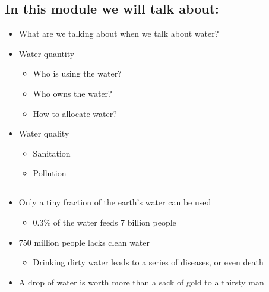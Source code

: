 \documentclass[]{article}
\providecommand{\tightlist}{%
  \setlength{\itemsep}{0pt}\setlength{\parskip}{0pt}}
\begin{document}
\hypertarget{in-this-module-we-will-talk-about}{%
\subsection{In this module we will talk
about:}\label{in-this-module-we-will-talk-about}}

\begin{itemize}
\tightlist
\item
  What are we talking about when we talk about water?
\item
  Water quantity

  \begin{itemize}
  \tightlist
  \item
    Who is using the water?
  \item
    Who owns the water?
  \item
    How to allocate water?
  \end{itemize}
\item
  Water quality

  \begin{itemize}
  \tightlist
  \item
    Sanitation
  \item
    Pollution
  \end{itemize}
\end{itemize}

\hypertarget{section-2}{%
\subsection{}\label{section-2}}

\hypertarget{section-3}{%
\subsection{}\label{section-3}}

\begin{itemize}
\tightlist
\item
  Only a tiny fraction of the earth's water can be used

  \begin{itemize}
  \tightlist
  \item
    0.3\% of the water feeds 7 billion people
  \end{itemize}
\item
  750 million people lacks clean water

  \begin{itemize}
  \tightlist
  \item
    Drinking dirty water leads to a series of diseases, or even death
  \end{itemize}
\item
  A drop of water is worth more than a sack of gold to a thirsty man
\end{itemize}
\end{document}

